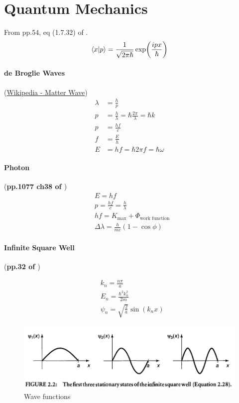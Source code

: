 \documentclass{article}
\numberwithin{equation}{subsection} %
\theoremstyle{definition}
\begin{document}
\section{Quantum Mechanics}
\label{sec:Quantum-Mechanics}

From pp.54, eq (1.7.32) of \cite{MordQM}.
\begin{equation}
    \braket{x|p} = \frac{1}{\sqrt{2\pi\hbar}}\exp(\frac{ipx}{\hbar})
\end{equation}
\paragraph{de Broglie Waves}
(\href{https://en.wikipedia.org/wiki/Matter_wave}{Wikipedia - Matter
Wave})
\begin{align}
    \lambda &= \frac{h}{p} \\
    p &= \frac{h}{\lambda} = \hbar\frac{2\pi}{\lambda} = \hbar k \\
    p &= \frac{hf}{c} \\
    f &= \frac{E}{h} \\
    E &= hf = \hbar2\pi f = \hbar\omega
\end{align}
\paragraph{Photon} (\textbf{pp.1077 ch38 of \cite{book}})
\begin{align}
    & E = h f \\
    & p= \frac{hf}{c} = \frac{h}{\lambda} \\
    & hf = K_\text{max} + \Phi_\text{work function} \\
    & \Delta\lambda = \frac{h}{mc}(1-\cos{\phi})
\end{align}

\paragraph{Infinite Square Well} (\textbf{pp.32 of \cite{Griffiths_QM}})

\begin{align}
    & k_n = \frac{n\pi}{a} \\
    & E_n = \frac{\hbar^2 k_n^2}{2m} \\
    & \psi_n = \sqrt{\frac{2}{a}} \sin(k_n x)
\end{align}
\begin{figure}[H]
    \centering
    \includegraphics[width=0.8\linewidth]{pics/qm_infinite_square_well.PNG}
    \caption{Wave functions}
\end{figure}
\end{document}
